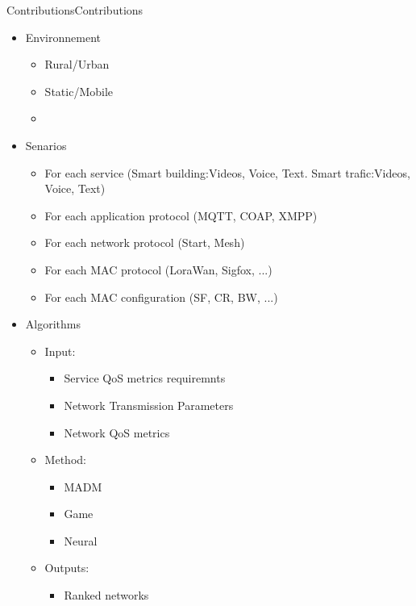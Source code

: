 \begin{frame}{Contributions}{Contributions}


\begin{itemize}
	\item Environnement
	\begin{itemize}
		\item Rural/Urban
		\item Static/Mobile
		\item 
	\end{itemize}
\end{itemize}

\begin{itemize}
	\item Senarios
	\begin{itemize}
		\item For each service (Smart building:Videos, Voice, Text. Smart trafic:Videos, Voice, Text)
		\item For each application protocol (MQTT, COAP, XMPP)
		\item For each network protocol (Start, Mesh)
		\item For each MAC protocol (LoraWan, Sigfox, ...)
		\item For each MAC configuration (SF, CR, BW, ...)
	\end{itemize}
\end{itemize}

\begin{itemize}
	\item Algorithms
	\begin{itemize}
		\item Input:
		\begin{itemize}
			\item Service QoS metrics requiremnts
			\item Network Transmission Parameters
			\item Network QoS metrics
		\end{itemize}


		\item Method:
		\begin{itemize}
			\item MADM
			\item Game
			\item Neural
		\end{itemize}

			\item Outputs:
		\begin{itemize}
			\item Ranked networks
		\end{itemize}
	\end{itemize}
\end{itemize}

\end{frame}
